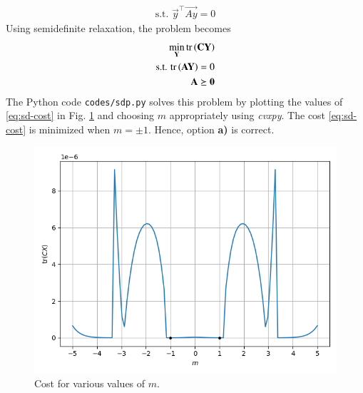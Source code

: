 \documentclass[journal,12pt,twocolumn]{IEEEtran}
\begin{document}
\begin{enumerate}
\begin{align}
        \textrm{s.t. } \vec{y}^\top\vec{Ay} = 0 \label{eq:y-constr}
    \end{align}
    Using semidefinite relaxation, the problem becomes
    \begin{align}
        \min_{\mathbf{Y}} \textrm{tr}\left(\mathbf{CY}\right) \label{eq:sd-cost} \\
        \textrm{s.t. } \textrm{tr}\left(\mathbf{AY}\right) = 0 \label{eq:sd-constr} \\
        \mathbf{A} \succeq \mathbf{0} \label{eq:sd-psd}
    \end{align}
    The Python code \texttt{codes/sdp.py} solves this problem by plotting
    the values of \eqref{eq:sd-cost} in Fig. \ref{fig:sdp-graph} and choosing 
    $m$ appropriately using \textit{cvxpy}. The cost \eqref{eq:sd-cost} is 
    minimized when $m = \pm 1$. Hence, option \textbf{a)} is correct.
    \begin{figure}[!ht]
        \centering
        \includegraphics[width=\columnwidth]{figs/sdp.png}
        \caption{Cost for various values of $m$.}
        \label{fig:sdp-graph}
    \end{figure}
\end{enumerate}
\end{document}
